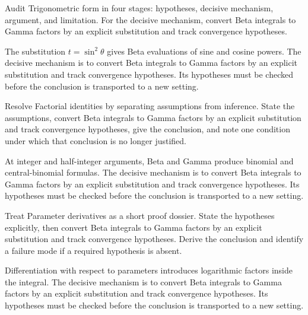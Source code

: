 \begin{problem}\label{prob:iv20-problem-05}
Audit Trigonometric form in four stages: hypotheses, decisive mechanism, argument, and limitation. For the decisive mechanism, convert Beta integrals to Gamma factors by an explicit substitution and track convergence hypotheses.
\end{problem}
\begin{solution}
The substitution $t=\sin^2\theta$ gives Beta evaluations of sine and cosine powers. The decisive mechanism is to convert Beta integrals to Gamma factors by an explicit substitution and track convergence hypotheses. Its hypotheses must be checked before the conclusion is transported to a new setting.
\end{solution}

\begin{problem}\label{prob:iv20-problem-06}
Resolve Factorial identities by separating assumptions from inference. State the assumptions, convert Beta integrals to Gamma factors by an explicit substitution and track convergence hypotheses, give the conclusion, and note one condition under which that conclusion is no longer justified.
\end{problem}
\begin{solution}
At integer and half-integer arguments, Beta and Gamma produce binomial and central-binomial formulas. The decisive mechanism is to convert Beta integrals to Gamma factors by an explicit substitution and track convergence hypotheses. Its hypotheses must be checked before the conclusion is transported to a new setting.
\end{solution}

\begin{problem}\label{prob:iv20-problem-07}
Treat Parameter derivatives as a short proof dossier. State the hypotheses explicitly, then convert Beta integrals to Gamma factors by an explicit substitution and track convergence hypotheses. Derive the conclusion and identify a failure mode if a required hypothesis is absent.
\end{problem}
\begin{solution}
Differentiation with respect to parameters introduces logarithmic factors inside the integral. The decisive mechanism is to convert Beta integrals to Gamma factors by an explicit substitution and track convergence hypotheses. Its hypotheses must be checked before the conclusion is transported to a new setting.
\end{solution}

